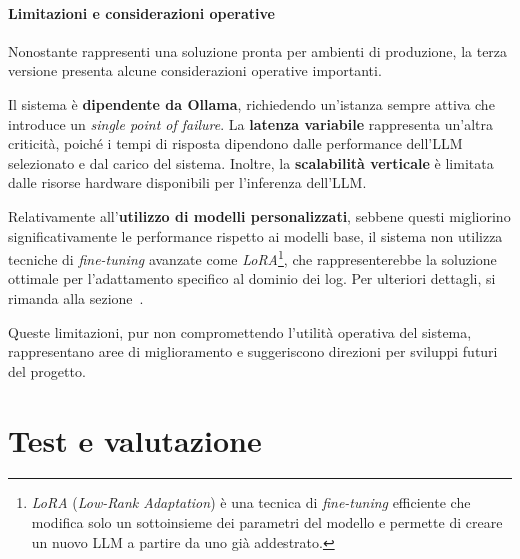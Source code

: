 \documentclass[12pt,twoside]{report}
\begin{document}
\subsubsection{Limitazioni e considerazioni operative}
\label{subsubsec:ver3_limitazioni}

Nonostante rappresenti una soluzione pronta per ambienti di produzione, la terza versione presenta alcune considerazioni operative importanti.

Il sistema è \textbf{dipendente da Ollama}, richiedendo un'istanza sempre attiva che introduce un \textit{single point of failure}. La \textbf{latenza variabile} rappresenta un'altra criticità, poiché i tempi di risposta dipendono dalle performance dell'LLM selezionato e dal carico del sistema. Inoltre, la \textbf{scalabilità verticale} è limitata dalle risorse hardware disponibili per l'inferenza dell'LLM.

Relativamente all'\textbf{utilizzo di modelli personalizzati}, sebbene questi migliorino significativamente le performance rispetto ai modelli base, il sistema non utilizza tecniche di \textit{fine-tuning} avanzate come \textit{LoRA}\footnote{\textit{LoRA} (\textit{Low-Rank Adaptation}) è una tecnica di \textit{fine-tuning} efficiente che modifica solo un sottoinsieme dei parametri del modello e permette di creare un nuovo LLM a partire da uno già addestrato.}, che rappresenterebbe la soluzione ottimale per l'adattamento specifico al dominio dei log. Per ulteriori dettagli, si rimanda alla sezione~.

Queste limitazioni, pur non compromettendo l'utilità operativa del sistema, rappresentano aree di miglioramento e suggeriscono direzioni per sviluppi futuri del progetto.



%
%

\cleardoublepage
\chapter{Test e valutazione}
\label{chap:test}
\end{document}
